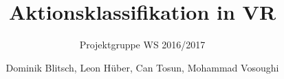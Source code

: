 \documentclass[german,11pt]{scrartcl}
\begin{document}
\sloppy

\setcounter{tocdepth}{2}

\title{Aktionsklassifikation in VR}
\subtitle{Projektgruppe WS 2016/2017}
\author{Dominik Blitsch, Leon Hüber, Can Tosun, Mohammad Vosoughi}

\maketitle







\clearpage
\end{document}
